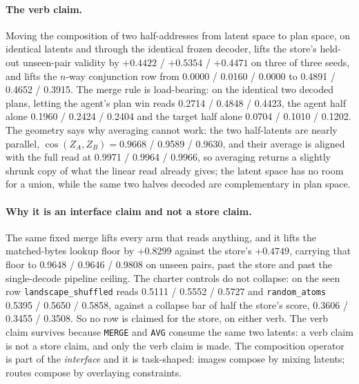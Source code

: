\documentclass{article} %
\begin{document}
\paragraph{The verb claim.} Moving the composition of two half-addresses from latent space to
plan space, on identical latents and through the identical frozen decoder, lifts the store's
held-out unseen-pair validity by $+0.4422$ / $+0.5354$ / $+0.4471$ on three of three seeds, and
lifts the $n$-way conjunction row from 0.0000 / 0.0160 / 0.0000 to 0.4891 / 0.4652 / 0.3915.
The merge rule is load-bearing: on the identical two decoded plans, letting the agent's plan
win reads 0.2714 / 0.4848 / 0.4423, the agent half alone 0.1960 / 0.2424 / 0.2404 and the target
half alone 0.0704 / 0.1010 / 0.1202. %
The geometry says why averaging cannot work: the two half-latents are nearly parallel,
$\cos(Z_A,Z_B)=0.9668$ / 0.9589 / 0.9630, and their average is aligned with the full read at
0.9971 / 0.9964 / 0.9966, so averaging returns a slightly shrunk copy of what the linear read
already gives; the latent space has no room for a union, while the same two halves decoded are
complementary in plan space. %

\paragraph{Why it is an interface claim and not a store claim.} The same fixed merge lifts every
arm that reads anything, and it lifts the matched-bytes lookup floor by $+0.8299$ against the
store's $+0.4749$, carrying that floor to 0.9648 / 0.9646 / 0.9808 on unseen pairs, past the
store and past the single-decode pipeline ceiling. %
The charter controls do not collapse: on the seen row \texttt{landscape\_shuffled} reads 0.5111
/ 0.5552 / 0.5727 and \texttt{random\_atoms} 0.5395 / 0.5650 / 0.5858, against a collapse bar of
half the store's score, 0.3606 / 0.3455 / 0.3508. %
So no row is claimed for the store, on either verb. The verb claim survives because
\texttt{MERGE} and \texttt{AVG} consume the same two latents: a verb claim is not a store claim,
and only the verb claim is made. The composition operator is part of the \emph{interface} and it
is task-shaped: images compose by mixing latents; routes compose by overlaying constraints.
\end{document}
